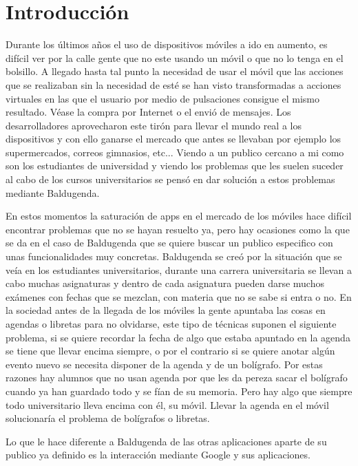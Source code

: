 \chapter{Introducción}

Durante los últimos años el uso de dispositivos móviles a ido en aumento, es difícil ver por la calle gente que no este usando un móvil o que no lo tenga en el bolsillo. A llegado hasta tal punto la necesidad de usar el móvil que las acciones que se realizaban sin la necesidad de esté se han visto transformadas a acciones virtuales en las que el usuario por medio de pulsaciones consigue el mismo resultado. Véase la compra por Internet o el envió de mensajes.
Los desarrolladores aprovecharon este tirón para llevar el mundo real a los dispositivos y con ello ganarse el mercado que antes se llevaban por ejemplo los supermercados, correos gimnasios, etc...
Viendo a un publico cercano a mi como son los estudiantes de universidad y viendo los problemas que les suelen suceder al cabo de los cursos universitarios se pensó en dar solución a estos problemas mediante Baldugenda.

En estos momentos la saturación de apps en el mercado de los móviles hace difícil encontrar problemas que no se hayan resuelto ya, pero hay ocasiones como la que se da en el caso de Baldugenda que se quiere buscar un publico especifico con unas funcionalidades muy concretas. Baldugenda se creó por la situación que se veía en los estudiantes universitarios, durante una carrera universitaria se llevan a cabo muchas asignaturas y dentro de cada asignatura pueden darse muchos exámenes con fechas que se mezclan, con materia que no se sabe si entra o no. En la sociedad antes de la llegada de los móviles la gente apuntaba las cosas en agendas o libretas para no olvidarse, este tipo de técnicas suponen el siguiente problema, si se quiere recordar la fecha de algo que estaba apuntado en la agenda se tiene que llevar encima siempre, o por el contrario si se quiere anotar algún evento nuevo se necesita disponer de la agenda y de un bolígrafo. Por estas razones hay alumnos que no usan agenda por que les da pereza sacar el bolígrafo cuando ya han guardado todo y se fían de su memoria. Pero hay algo que siempre todo universitario lleva encima con él, su móvil. Llevar la agenda en el móvil solucionaría el problema de bolígrafos o libretas. 

Lo que le hace diferente a Baldugenda de las otras aplicaciones aparte de su publico ya definido es la interacción mediante Google y sus aplicaciones.

